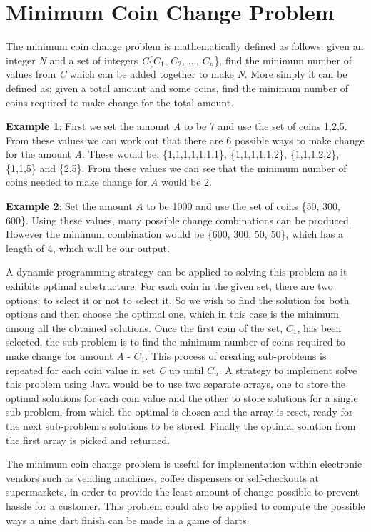 \section{Minimum Coin Change Problem}
The minimum coin change problem is mathematically defined as follows: given an integer \textit{N} and a set of integers \textit{C}\{$C_{1}$, $C_{2}$, ..., $C_{n}$\}, find the minimum number of values from \textit{C} which can be added together to make \textit{N}. More simply it can be defined as: given a total amount and some coins, find the minimum number of coins required to make change for the total amount.
\par\noindent
\textbf{Example 1}: First we set the amount \textit{A} to be 7 and use the set of coins {1,2,5}. From these values we can work out that there are 6 possible ways to make change for the amount \textit{A}. These would be: \{1,1,1,1,1,1,1\}, \{1,1,1,1,1,2\}, \{1,1,1,2,2\}, \{1,1,5\} and \{2,5\}. From these values we can see that the minimum number of coins needed to make change for \textit{A} would be 2.
\par\noindent
\textbf{Example 2}: Set the amount \textit{A} to be 1000 and use the set of coins \{50, 300, 600\}. Using these values, many possible change combinations can be produced. However the minimum combination would be \{600, 300, 50, 50\}, which has a length of 4, which will be our output.
\par\noindent
A dynamic programming strategy can be applied to solving this problem as it exhibits optimal substructure. For each coin in the given set, there are two options; to select it or not to select it. So we wish to find the solution for both options and then choose the optimal one, which in this case is the minimum among all the obtained solutions. Once the first coin of the set, $C_1$, has been selected, the sub-problem is to find the minimum number of coins required to make change for amount \textit{A} - $C_1$. This process of creating sub-problems is repeated for each coin value in set \textit{C} up until $C_n$. A strategy to implement solve this problem using Java would be to use two separate arrays, one to store the optimal solutions for each coin value and the other to store solutions for a single sub-problem, from which the optimal is chosen and the array is reset, ready for the next sub-problem's solutions to be stored. Finally the optimal solution from the first array is picked and returned.
\par\noindent
The minimum coin change problem is useful for implementation within electronic vendors such as vending machines, coffee dispensers or self-checkouts at supermarkets, in order to provide the least amount of change possible to prevent hassle for a customer. This problem could also be applied to compute the possible ways a nine dart finish can be made in a game of darts.

